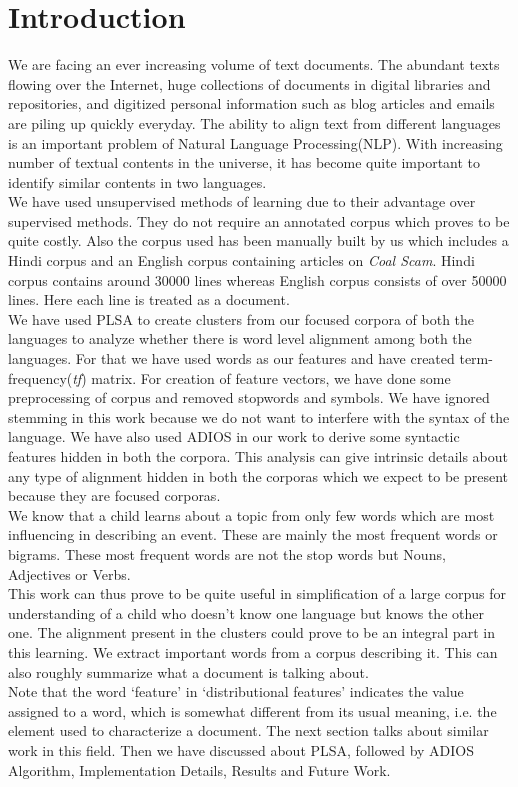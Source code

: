 \documentclass{article}
\begin{document}
\section{Introduction}
We are facing an ever increasing volume of text documents. The abundant texts flowing over the Internet, huge collections of documents in digital libraries and repositories, and digitized personal information such as blog articles and emails are piling up quickly everyday. The ability to align text from different languages is an important problem of Natural Language Processing(NLP). With increasing number of textual contents in the universe, it has become quite important to identify similar contents in two languages.\\
We have used unsupervised methods of learning due to their advantage over supervised methods. They do not require an annotated corpus which proves to be quite costly. Also the corpus used has been manually built by us which includes a Hindi corpus and an English corpus containing articles on \emph{Coal Scam}. Hindi corpus contains around 30000 lines whereas English corpus consists of over 50000 lines. Here each line is treated as a document.\\
We have used PLSA to create clusters from our focused corpora of both the languages to analyze whether there is word level alignment among both the languages. For that we have used words as our features and have created term-frequency(\emph{tf}) matrix. For creation of feature vectors, we have done some preprocessing of corpus and removed stopwords and symbols. We have ignored stemming in this work because we do not want to interfere with the syntax of the language.\newpage
We have also used ADIOS in our work to derive some syntactic features hidden in both the corpora. This analysis can give intrinsic details about any type of alignment hidden in both the corporas which we expect to be present because they are focused corporas.\\
We know that a child learns about a topic from only few words which are most influencing in describing an event. These are mainly the most frequent words or bigrams. These most frequent words are not the stop words but Nouns, Adjectives or Verbs. \\
This work can thus prove to be quite useful in simplification of a large corpus for understanding of a child who doesn't know one language but knows the other one. The alignment present in the clusters could prove to be an integral part in this learning. We extract important words from a corpus describing it. This can also roughly summarize what a document is talking about.\\
Note that the word ‘feature’ in ‘distributional features’ indicates the value assigned to a word, which is somewhat different from its usual meaning, i.e. the element used to characterize a document.
The next section talks about similar work in this field. Then we have discussed about PLSA, followed by ADIOS Algorithm, Implementation Details, Results and Future Work.
\end{document}
